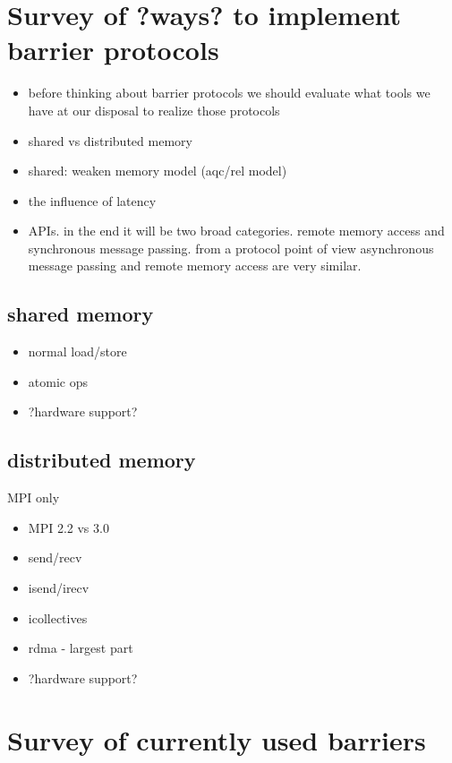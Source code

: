 \documentclass[a4paper, 10pt]{article}
\begin{document}
\section{Survey of ?ways? to implement barrier protocols}
\begin{itemize}
	\item before thinking about barrier protocols we should evaluate what tools we have at our disposal to realize those protocols
	\item shared vs distributed memory
	\item shared: weaken memory model (aqc/rel model)
	\item the influence of latency
	\item APIs. in the end it will be two broad categories. remote memory access and synchronous message passing. from a protocol point of view asynchronous message passing and remote memory access are very similar.
\end{itemize}

\subsection{shared memory}
\begin{itemize}
	\item normal load/store
	\item atomic ops
	\item ?hardware support?
\end{itemize}

\subsection{distributed memory}
MPI only
\begin{itemize}
	\item MPI 2.2 vs 3.0
	\item send/recv
	\item isend/irecv
	\item icollectives
	\item rdma - largest part
	\item ?hardware support?
\end{itemize}

\section{Survey of currently used barriers}
\end{document}
